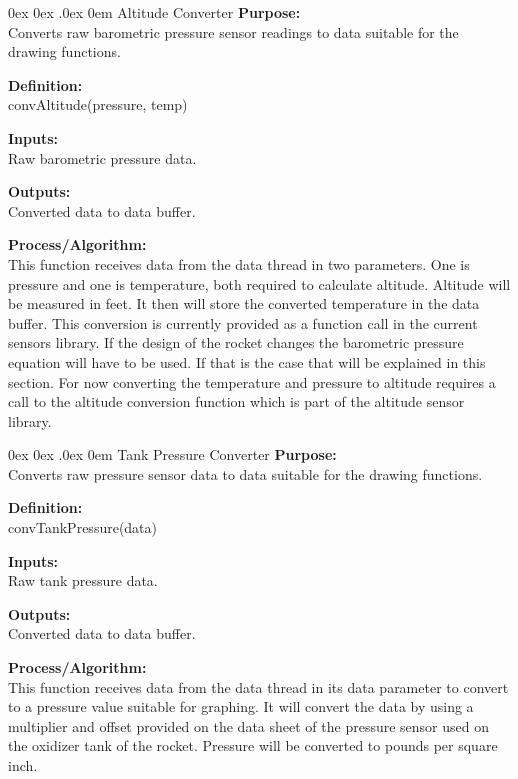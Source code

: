 \documentclass[10pt,draftclsnofoot,onecolumn,compsoc]{IEEEtran}
\makeatletter
\renewcommand\paragraph{\@startsection{paragraph}{4}{\z@}%
                                    {0ex \@plus0ex \@minus.0ex}%
                                    {0em}%
                                    {\normalfont\normalsize\bfseries}}
\makeatother
\begin{document}
\paragraph{Altitude Converter}
{\bf Purpose:} \\
Converts raw barometric pressure sensor readings to data suitable for the drawing functions.  \par
{\bf Definition:} \\ 
convAltitude(pressure, temp) \par
{\bf Inputs:} \\ Raw barometric pressure data. \par
{\bf Outputs:} \\ Converted data to data buffer. \par
{\bf Process/Algorithm:} \\
This function receives data from the data thread in two parameters. One is pressure and one is temperature, both required to calculate altitude. Altitude will be measured in feet.  It then will store the converted temperature in the data buffer. This conversion is currently provided as a function call in the current sensors library. If the design of the rocket changes the barometric pressure equation will have to be used. If that is the case that will be explained in this section. For now converting the temperature and pressure to altitude requires a call to the altitude conversion function which is part of the altitude sensor library. \par

\paragraph{Tank Pressure Converter}
{\bf Purpose:} \\
Converts raw pressure sensor data to data suitable for the drawing functions.  \par
{\bf Definition:} \\ 
convTankPressure(data) \par
{\bf Inputs:} \\ Raw tank pressure data. \par
{\bf Outputs:} \\ Converted data to data buffer. \par
{\bf Process/Algorithm:} \\
This function receives data from the data thread in its data parameter to convert to a pressure value suitable for graphing. It will convert the data by using a multiplier and offset provided on the data sheet of the pressure sensor used on the oxidizer tank of the rocket. Pressure will be converted to pounds per square inch. \par
\end{document}
